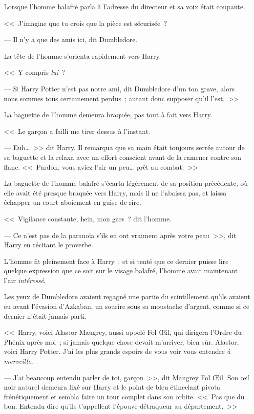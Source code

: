 Lorsque l'homme balafré parla à l'adresse du directeur et sa voix était coupante.

<<~J'imagine que tu crois que la pièce est sécurisée~?

--- Il n'y a que des amis ici, dit Dumbledore.

La tête de l'homme s'orienta rapidement vers Harry.

<<~Y compris \emph{lui}~?

--- Si Harry Potter n'est pas notre ami, dit Dumbledore d'un ton grave, alors nous sommes tous certainement perdus~; autant donc supposer qu'il l'est.~>>

La baguette de l'homme demeura braquée, pas tout à fait vers Harry.

<<~Le garçon a failli me tirer dessus à l'instant.

--- Euh…~>> dit Harry. Il remarqua que sa main était toujours serrée autour de sa baguette et la relaxa avec un effort conscient avant de la ramener contre son flanc. <<~Pardon, vous aviez l'air un peu… prêt au combat.~>>

La baguette de l'homme balafré s'écarta légèrement de sa position précédente, où elle avait été presque braquée vers Harry, mais il ne l'abaissa pas, et laissa échapper un court aboiement en guise de rire.

<<~Vigilance constante, hein, mon gars~? dit l'homme.

--- Ce n'est pas de la paranoïa s'ils en ont vraiment après votre peau~>>, dit Harry en récitant le proverbe.

L'homme fit pleinement face à Harry~; et si tenté que ce dernier puisse lire quelque expression que ce soit sur le visage balafré, l'homme avait maintenant l'air \emph{intéressé}.

Les yeux de Dumbledore avaient regagné une partie du scintillement qu'ils avaient eu avant l'évasion d'Azkaban, un sourire sous sa moustache d'argent, comme si ce dernier n'était jamais parti.

<<~Harry, voici Alastor Maugrey, aussi appelé Fol Œil, qui dirigera l'Ordre du Phénix après moi~; si jamais quelque chose devait m'arriver, bien sûr. Alastor, voici Harry Potter. J'ai les plus grands espoirs de vous voir vous entendre \emph{à merveille}.

--- J'ai beaucoup entendu parler de toi, garçon~>>, dit Maugrey Fol Œil. Son œil noir naturel demeura fixé sur Harry et le point de bleu étincelant pivota frénétiquement et sembla faire un tour complet dans son orbite. <<~Pas que du bon. Entendu dire qu'ils t'appellent l'épouve-détraqueur au département.~>>

